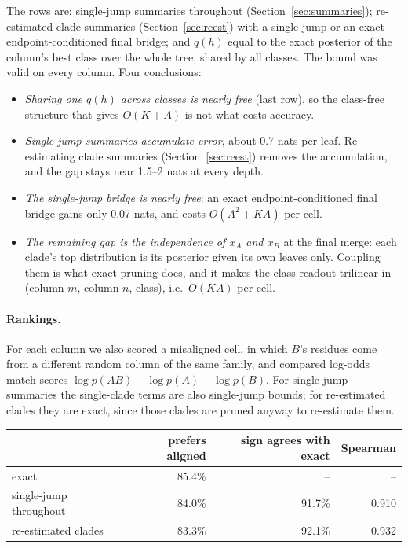 \documentclass[11pt]{article}
\begin{document}
The rows are: single-jump summaries throughout
(Section~\ref{sec:summaries}); re-estimated clade summaries
(Section~\ref{sec:reest}) with a single-jump or an exact endpoint-conditioned
final bridge; and $q(h)$ equal to the exact posterior of the column's best
class over the whole tree, shared by all classes. The bound was valid on every
column. Four conclusions:
\begin{itemize}
\item \emph{Sharing one $q(h)$ across classes is nearly free} (last row), so
  the class-free structure that gives $O(K+A)$ is not what costs accuracy.
\item \emph{Single-jump summaries accumulate error}, about 0.7 nats per leaf.
  Re-estimating clade summaries (Section~\ref{sec:reest}) removes the
  accumulation, and the gap stays near 1.5--2 nats at every depth.
\item \emph{The single-jump bridge is nearly free}: an exact endpoint-conditioned
  final bridge gains only 0.07 nats, and costs $O(A^2+KA)$ per cell.
\item \emph{The remaining gap is the independence of $x_A$ and $x_B$} at the
  final merge: each clade's top distribution is its posterior given its own
  leaves only. Coupling them is what exact pruning does, and it makes the class
  readout trilinear in (column $m$, column $n$, class), i.e.\ $O(KA)$ per cell.
\end{itemize}

\paragraph{Rankings.} For each column we also scored a misaligned cell, in
which $B$'s residues come from a different random column of the same family,
and compared log-odds match scores $\log p(AB)-\log p(A)-\log p(B)$. For single-jump summaries
the single-clade terms are also single-jump bounds; for re-estimated clades
they are exact, since those clades are pruned anyway to re-estimate them.

\begin{center}
\begin{tabular}{lrrr}
\toprule
 & prefers aligned & sign agrees with exact & Spearman\\
\midrule
exact & 85.4\% & -- & --\\
single-jump throughout & 84.0\% & 91.7\% & 0.910\\
re-estimated clades & 83.3\% & 92.1\% & 0.932\\
\bottomrule
\end{tabular}
\end{center}
\end{document}
